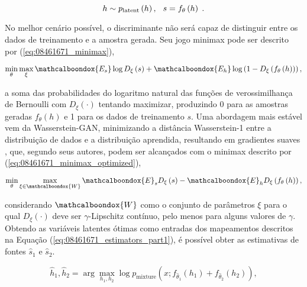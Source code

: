 \begin{equation}
    h\sim p_{\text{latent}}\left(h\right), \hspace{0.25cm} s = f_{\theta}\left(h\right) \hspace{0.10cm}.
    \label{eq:08461671_gen_process}
\end{equation}

No melhor cenário possível, o discriminante não será capaz de distinguir entre os dados de treinamento e a amostra gerada. Seu jogo minimax pode ser descrito por (\ref{eq:08461671_minimax}),

\begin{equation}
    \min_{\theta}\max_{\xi}\mathcalboondox{E_{s}}\log D_{\xi}\left(s\right) + \mathcalboondox{E_{h}}\log \left(1-D_{\xi}\left(f_{\theta}\left(h\right)\right)\right),
    \label{eq:08461671_minimax}
\end{equation}

\noindent a soma das probabilidades do logaritmo natural das funções de verossimilhança de Bernoulli com $D_ {\xi}\left(\cdot\right)$ tentando maximizar, produzindo 0 para as amostras geradas $f_{\theta}\left(h\right)$ e 1 para os dados de treinamento $s$. Uma abordagem mais estável vem da Wasserstein-GAN, minimizando a distância Wasserstein-1 \citep{OLKIN1982257} entre a distribuição de dados e a distribuição aprendida, resultando em gradientes suaves \citep{arjovsky2017wasserstein}, que, segundo seus autores, podem ser alcançados com o minimax descrito por (\ref{eq:08461671_minimax_optimized}),

\begin{equation}
    \min_{\theta}\max_{\xi\in\mathcalboondox{W}}\mathcalboondox{E}_{s}D_{\xi}\left(s\right) - \mathcalboondox{E}_{h}D_{\xi}\left(f_{\theta}\left(h\right)\right),
    \label{eq:08461671_minimax_optimized}
\end{equation}


\noindent considerando $\mathcalboondox{W}$ como o conjunto de parâmetros $\xi$ para o qual $D_{\xi}\left(\cdot\right)$ deve ser $\gamma$-Lipschitz contínuo, pelo menos para alguns valores de $\gamma$. Obtendo as variáveis latentes ótimas como entradas dos mapeamentos
 descritos na Equação (\ref{eq:08461671_estimators_part1}), é possível obter as estimativas de fontes $\widehat{s}_{1}$ e $\widehat{s}_{2}$.

\begin{equation}
    \widehat{h}_{1}, \widehat{h}_{2} = \arg \max_{h_{1}, h_{2}} \log p_{\text{mixture}}\left(x; f_{\widehat{\theta}_{1}}\left(h_{1}\right)+f_{\widehat{\theta}_{2}}\left(h_{2}\right)\right),
    \label{eq:08461671_estimators_part1}
\end{equation}

